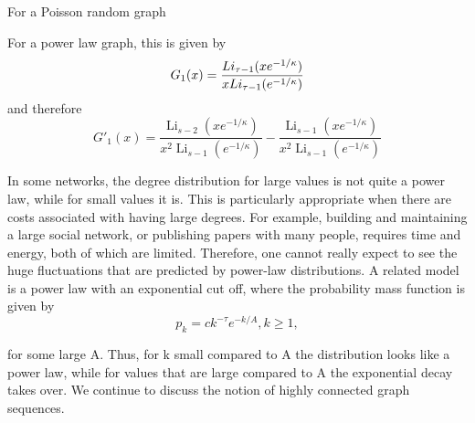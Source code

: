For a Poisson random graph







For a power law graph, this is given by
\begin{equation}
	G_1(x) = \frac{Li_{\tau-1} ({xe^{-1/\kappa}})}{xLi_{\tau-1} ({e^{-1/\kappa}})}
\end{equation}
and therefore
\begin{equation}
	G'_1(x) = \frac{\operatorname{Li}_{s - 2} \left(x e^{- 1/\kappa}\right)}
	               {x^{2} \operatorname{Li}_{s - 1}\left(e^{- 1/\kappa}\right)} -
	          \frac{\operatorname{Li}_{s - 1}\left(x e^{- 1/\kappa}\right)}
	               {x^{2} \operatorname{Li}_{s - 1}\left(e^{- 1/\kappa}\right)}
\end{equation}




In some networks, the degree distribution for large values is not quite a power law, while for small values it is. This is particularly appropriate when there are costs associated with having large degrees. For example, building and maintaining a large social network, or publishing papers with many people, requires time and energy, both of which are limited. Therefore, one cannot really expect to see the huge fluctuations that are predicted by power-law distributions. A related model is a power law with an exponential cut off, where the probability mass function is given by
\begin{equation}
	p_k = ck^{-\tau} e^{− k / A}, k \ge 1,
\end{equation}

for some large A. Thus, for k small compared to A the distribution looks like a power law, while for values that are large compared to A the exponential decay takes over.
We continue to discuss the notion of highly connected graph sequences.



